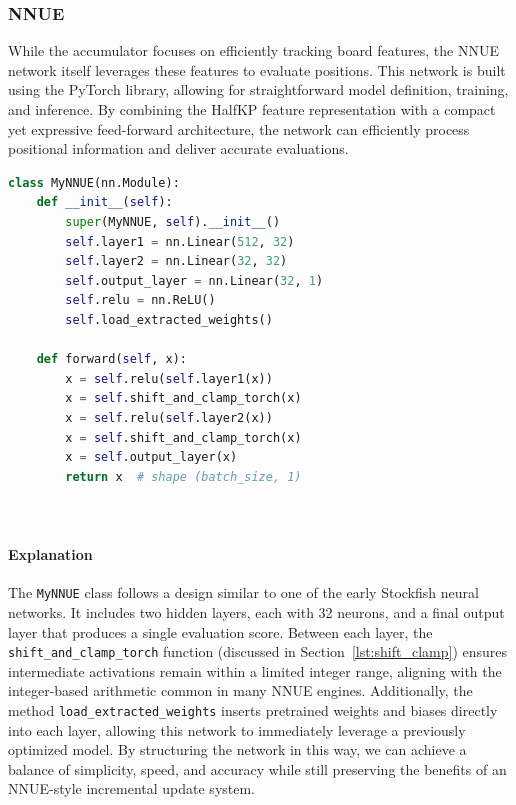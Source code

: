 \documentclass[12pt,a4paper]{article}
\begin{document}
\subsubsection*{NNUE}
\label{subsec:nnue_net}

While the accumulator focuses on efficiently tracking board features, the NNUE network itself leverages these features to evaluate positions. This network is built using the PyTorch library, allowing for straightforward model definition, training, and inference. By combining the HalfKP feature representation with a compact yet expressive feed-forward architecture, the network can efficiently process positional information and deliver accurate evaluations. 

\begin{lstlisting}[language=Python, 
                   caption={A simplified PyTorch implementation of the NNUE network structure}, 
                   label={lst:nnue_network},
                   basicstyle=\footnotesize\ttfamily,
                   breaklines=true]
class MyNNUE(nn.Module):
    def __init__(self):
        super(MyNNUE, self).__init__()
        self.layer1 = nn.Linear(512, 32)
        self.layer2 = nn.Linear(32, 32)
        self.output_layer = nn.Linear(32, 1)
        self.relu = nn.ReLU()
        self.load_extracted_weights()

    def forward(self, x):
        x = self.relu(self.layer1(x))
        x = self.shift_and_clamp_torch(x)
        x = self.relu(self.layer2(x))
        x = self.shift_and_clamp_torch(x)
        x = self.output_layer(x)
        return x  # shape (batch_size, 1)

   
\end{lstlisting}

\paragraph{Explanation}
The \texttt{MyNNUE} class follows a design similar to one of the early Stockfish neural networks. It includes two hidden layers, each with 32 neurons, and a final output layer that produces a single evaluation score. Between each layer, the \texttt{shift\_and\_clamp\_torch} function (discussed in Section~\ref{lst:shift_clamp}) ensures intermediate activations remain within a limited integer range, aligning with the integer-based arithmetic common in many NNUE engines. Additionally, the method \texttt{load\_extracted\_weights} inserts pretrained weights and biases directly into each layer, allowing this network to immediately leverage a previously optimized model. By structuring the network in this way, we can achieve a balance of simplicity, speed, and accuracy while still preserving the benefits of an NNUE-style incremental update system.
\end{document}
